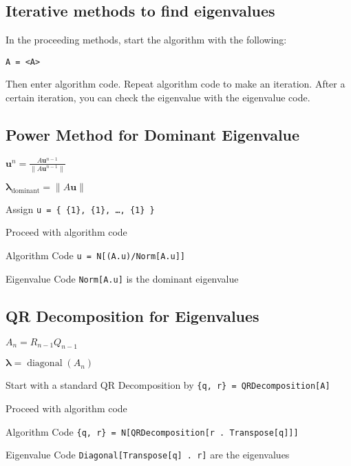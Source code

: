 \documentclass[10pt,letterpaper]{article}
\newenvironment{tight_item}
{\begin{itemize}
\setlength{\parskip}{0pt}
\setlength{\parsep}{0pt}
\setlength{\itemsep}{0pt}
\setlength{\parsep}{0pt}
\setlength{\topsep}{0pt}
\setlength{\partopsep}{0pt}
\setlength{\leftmargin}{0em}
\setlength{\labelwidth}{0em}
\setlength{\labelsep}{1em} }
{\end{itemize}}
\newenvironment{tight_enum}
{\begin{enumerate}
\setlength{\parskip}{0pt}
\setlength{\parsep}{0pt}
\setlength{\itemsep}{0pt}
\setlength{\parsep}{0pt}
\setlength{\topsep}{0pt}
\setlength{\partopsep}{0pt}
\setlength{\leftmargin}{0em}
\setlength{\labelwidth}{0em}
\setlength{\labelsep}{1em} }
{\end{enumerate}}
\newenvironment{tight_desc}
{\begin{description}
\setlength{\parskip}{0pt}
\setlength{\parsep}{0pt}
\setlength{\itemsep}{0pt}
\setlength{\parsep}{0pt}
\setlength{\topsep}{0pt}
\setlength{\partopsep}{0pt}
\setlength{\leftmargin}{0em}
\setlength{\labelwidth}{0em}
\setlength{\labelsep}{1em} }
{\end{description}}
\begin{document}
\begin{multicols*}{2}
\section{Iterative methods to find eigenvalues}
\begin{tight_item}
\item In the proceeding methods, start the algorithm with the following:
\begin{tight_enum}
\item \texttt{A = <A>}
\end{tight_enum}
Then enter algorithm code. Repeat algorithm code to make an iteration. After a
certain iteration, you can check the eigenvalue with the eigenvalue code.
\end{tight_item}

\subsection{Power Method for Dominant Eigenvalue}
\begin{tight_item}
\item $\mathbf{u}^{n} = \frac{A\textbf{u}^{n-1}}{\|A\textbf{u}^{n-1}\|}$
\item $ \mathbf{\lambda}_{\operatorname{dominant}} = \|A\mathbf{u} \| $
\end{tight_item}
\begin{tight_enum}
\item Assign \texttt{u = \{ \{1\}, \{1\}, \ldots, \{1\} \}}
\item Proceed with algorithm code
\end{tight_enum}
\begin{tight_desc}
\item[Algorithm Code]\texttt{u = N[(A.u)/Norm[A.u]]}
\item[Eigenvalue Code] \texttt{Norm[A.u]} is the dominant eigenvalue
\end{tight_desc}


\subsection{QR Decomposition for Eigenvalues}
\begin{tight_item}
\item $A_{n} = R_{n-1} Q_{n-1}$
\item $ \mathbf{\lambda} = \operatorname{diagonal}(A_{n})$
\end{tight_item}
\begin{tight_enum}
\item Start with a standard QR Decomposition by \texttt{\{q, r\} = QRDecomposition[A]}
\item Proceed with algorithm code
\end{tight_enum}
\begin{tight_desc}
\item[Algorithm Code]\texttt{\{q, r\} = N[QRDecomposition[r . Transpose[q]]]}
\item[Eigenvalue Code] \texttt{Diagonal[Transpose[q] . r]} are the eigenvalues
\end{tight_desc}

\end{multicols*}
\end{document}
